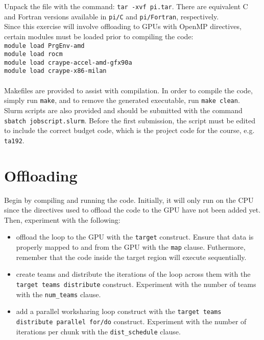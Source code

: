 \documentclass{article}
\begin{document}
\noindent Unpack the file with the command: \texttt{tar -xvf pi.tar}. There are equivalent C and Fortran versions available in \texttt{pi/C} and \texttt{pi/Fortran}, respectively.\\

\noindent Since this exercise will involve offloading to GPUs with OpenMP directives, certain modules must be loaded prior to compiling the code: \\

\texttt{module load PrgEnv-amd} \\
\indent \texttt{module load rocm} \\
\indent \texttt{module load craype-accel-amd-gfx90a} \\
\indent \texttt{module load craype-x86-milan} 
\\~\\
\noindent Makefiles are provided to assist with compilation. In order to compile the code, simply run \texttt{make}, and to remove the generated executable, run \texttt{make clean}. \\

\noindent Slurm scripts are also provided and should be submitted with the command \texttt{sbatch jobscript.slurm}. Before the first submission, the script must be edited to include the correct budget code, which is the project code for the course, e.g. \texttt{ta192}. 


\section{Offloading}

Begin by compiling and running the code. Initially, it will only run on the CPU since the directives used to offload the code to the GPU have not been added yet. \\

\noindent Then, experiment with the following:



\begin{itemize}
    \item offload the loop to the GPU with the \texttt{target} construct. Ensure that data is properly mapped to and from the GPU with the \texttt{map} clause. Futhermore, remember that the code inside the target region will execute sequentially.
    \item create teams and distribute the iterations of the loop across them with the \texttt{target teams distribute} construct. Experiment with the number of teams with the \texttt{num\_teams} clause.
    \item add a parallel worksharing loop construct with the \texttt{target teams distribute parallel for/do} construct. Experiment with the number of iterations per chunk with the \texttt{dist\_schedule} clause.
\end{itemize}
\end{document}
